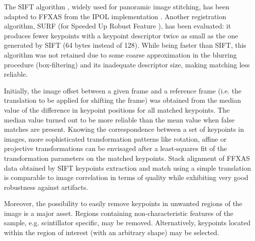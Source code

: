 \documentclass[preprint]{iucr}
\begin{document}
The SIFT algorithm \cite{Lowe99,Lowe04}, widely used for panoramic image
stitching, has been adapted to FFXAS from the IPOL implementation \cite{ASIFT}.
Another registration algorithm, SURF (for Speeded Up Robust Feature
\cite{surf,surf_ipol}), has been evaluated: it produces fewer keypoints with a
keypoint descriptor twice as small as the one generated by SIFT (64 bytes instead
of 128). 
While being faster than SIFT, this algorithm was not
retained due to some coarse approximation in the blurring procedure
(box-filtering) and its inadequate descriptor size, making matching less
reliable.

Initially, the image offset between a given frame and a reference frame (i.e.
the translation to be applied for shifting the frame) was obtained from the
median value of the difference in keypoint positions for all matched keypoints.
The median value turned out to be more reliable than the mean value when
false matches are present.
Knowing the correspondence between a set of keypoints in images, more
sophisticated transformation patterns like rotation, affine or projective
transformations can be envisaged after a least-squares fit of the
transformation parameters on the matched keypoints.
Stack alignment of FFXAS data obtained by SIFT keypoints extraction and match
using a simple translation is comparable to image correlation in terms of
quality while exhibiting very good robustness against artifacts.

Moreover, the possibility to easily remove keypoints in unwanted regions of
the image is a major asset.
Regions containing non-characteristic features of the sample, e.g. scintillator
specific, may be removed. Alternatively, keypoints located within the
region of interest (with an arbitrary shape) may be selected.
\end{document}
